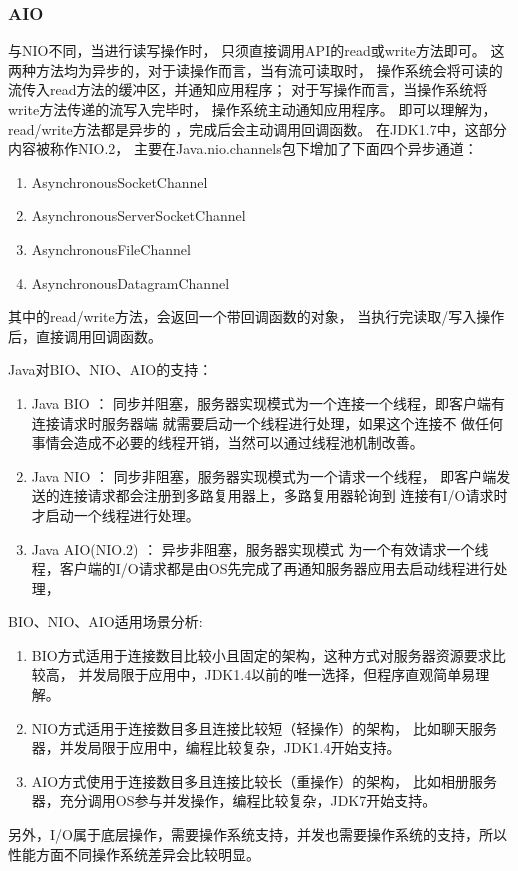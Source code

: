 \subsubsection{AIO}
与NIO不同，当进行读写操作时，
只须直接调用API的read或write方法即可。
这两种方法均为异步的，对于读操作而言，当有流可读取时，
操作系统会将可读的流传入read方法的缓冲区，并通知应用程序；
对于写操作而言，当操作系统将write方法传递的流写入完毕时，
操作系统主动通知应用程序。 
 即可以理解为，read/write方法都是异步的
 ，完成后会主动调用回调函数。  在JDK1.7中，这部分内容被称作NIO.2，
 主要在Java.nio.channels包下增加了下面四个异步通道：
\begin{enumerate}
	\item AsynchronousSocketChannel
 \item  AsynchronousServerSocketChannel
\item AsynchronousFileChannel
\item AsynchronousDatagramChannel
\end{enumerate}
其中的read/write方法，会返回一个带回调函数的对象，
当执行完读取/写入操作后，直接调用回调函数。

Java对BIO、NIO、AIO的支持：
\begin{enumerate}
	\item Java BIO ： 同步并阻塞，服务器实现模式为一个连接一个线程，即客户端有连接请求时服务器端
	就需要启动一个线程进行处理，如果这个连接不
	做任何事情会造成不必要的线程开销，当然可以通过线程池机制改善。
\item Java NIO ： 同步非阻塞，服务器实现模式为一个请求一个线程，
即客户端发送的连接请求都会注册到多路复用器上，多路复用器轮询到
连接有I/O请求时才启动一个线程进行处理。
\item Java AIO(NIO.2) ： 异步非阻塞，服务器实现模式
为一个有效请求一个线程，客户端的I/O请求都是由OS先完成了再通知服务器应用去启动线程进行处理，
\end{enumerate}
BIO、NIO、AIO适用场景分析:
\begin{enumerate}
	\item BIO方式适用于连接数目比较小且固定的架构，这种方式对服务器资源要求比较高，
	并发局限于应用中，JDK1.4以前的唯一选择，但程序直观简单易理解。
\item NIO方式适用于连接数目多且连接比较短（轻操作）的架构，
比如聊天服务器，并发局限于应用中，编程比较复杂，JDK1.4开始支持。
\item AIO方式使用于连接数目多且连接比较长（重操作）的架构，
比如相册服务器，充分调用OS参与并发操作，编程比较复杂，JDK7开始支持。
\end{enumerate}
另外，I/O属于底层操作，需要操作系统支持，并发也需要操作系统的支持，所以性能方面不同操作系统差异会比较明显。

